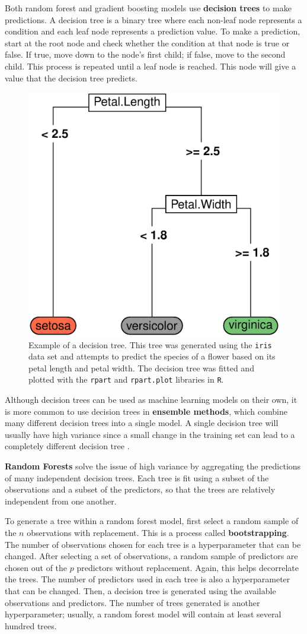 \documentclass{article}
\begin{document}
Both random forest and gradient boosting models use \textbf{decision trees} to make predictions. A decision tree is a binary tree where each non-leaf node represents a condition and each leaf node represents a prediction value. To make a prediction, start at the root node and check whether the condition at that node is true or false. If true, move down to the node's first child; if false, move to the second child. This process is repeated until a leaf node is reached. This node will give a value that the decision tree predicts.

\begin{figure}[h!]
	\centering
	\includegraphics[width = 0.4\linewidth]{images/decision-tree.eps}
	\captionsetup{width = 4in}
	\caption{Example of a decision tree. This tree was generated using the \lstinline!iris! data set and attempts to predict the species of a flower based on its petal length and petal width. The decision tree was fitted and plotted with the \lstinline!rpart! and \lstinline!rpart.plot! libraries in \lstinline!R!.}
	\label{fig:decision-tree}
\end{figure}

Although decision trees can be used as machine learning models on their own, it is more common to use decision trees in \textbf{ensemble methods}, which combine many different decision trees into a single model. A single decision tree will usually have high variance since a small change in the training set can lead to a completely different decision tree \cite{james2013introduction}.

\textbf{Random Forests} solve the issue of high variance by aggregating the predictions of many independent decision trees. Each tree is fit using a subset of the observations and a subset of the predictors, so that the trees are relatively independent from one another.

To generate a tree within a random forest model, first select a random sample of the $n$ observations with replacement. This is a process called \textbf{bootstrapping}. The number of observations chosen for each tree is a hyperparameter that can be changed. After selecting a set of observations, a random sample of predictors are chosen out of the $p$ predictors without replacement. Again, this helps decorrelate the trees. The number of predictors used in each tree is also a hyperparameter that can be changed. Then, a decision tree is generated using the available observations and predictors. The number of trees generated is another hyperparameter; usually, a random forest model will contain at least several hundred trees.
\end{document}
